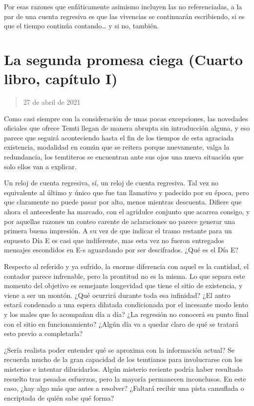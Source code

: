 \documentclass[
]{book}
\begin{document}
Por esas razones que enfáticamente asimismo incluyen las no referenciadas, a la par de una cuenta regresiva es que las vivencias se continuarán escribiendo, si es que el tiempo continúa contando\ldots{} y si no, también.

\hypertarget{la-segunda-promesa-ciega-cuarto-libro-capuxedtulo-i}{%
\section{La segunda promesa ciega (Cuarto libro, capítulo I)}\label{la-segunda-promesa-ciega-cuarto-libro-capuxedtulo-i}}

\begin{quote}
27 de abril de 2021
\end{quote}

Como casi siempre con la consideración de unas pocas excepciones, las novedades oficiales que ofrece Temti llegan de manera abrupta sin introducción alguna, y eso parece que seguirá aconteciendo hasta el fin de los tiempos de esta agraciada existencia, modalidad en común que se reitera porque nuevamente, valga la redundancia, los temtiteros se encuentran ante sus ojos una nueva situación que solo ellos van a explicar.

Un reloj de cuenta regresiva, sí, un reloj de cuenta regresiva. Tal vez no equivalente al último y único que fue tan llamativo y padecido por su época, pero que claramente no puede pasar por alto, menos mientras descuenta. Difiere que ahora el antecedente ha marcado, con el agridulce conjunto que acarrea consigo, y por aquellas razones un conteo carente de aclaraciones no parece generar una primera buena impresión. A su vez de que indicar el tramo restante para un supuesto Día E es casi que indiferente, mas esta vez no fueron entregados mensajes escondidos en E-s aguardando por ser descifrados. ¿Qué es el Día E?

Respecto al referido y ya sufrido, la enorme diferencia con aquel es la cantidad, el contador parece infrenable, pero la prontitud no es la misma. Lo que separa este momento del objetivo es semejante longevidad que tiene el sitio de existencia, y viene a ser un montón. ¿Qué ocurrirá durante toda esa infinidad? ¿El antro estará condenado a una espera dilatada condicionada por el incesante modo lento y los males que lo acompañan día a día? ¿La regresión no conocerá su punto final con el sitio en funcionamiento? ¿Algún día va a quedar claro de qué se tratará esto previo a completarla?

¿Sería realista poder entender qué se aproxima con la información actual? Se recuerda mucho de la gran capacidad de los temtianos para involucrarse con los misterios e intentar dilucidarlos. Algún misterio reciente podría haber resultado resuelto tras pesados esfuerzos, pero la mayoría permanecen inconclusos. En este caso, ¿hay algo más que antes a resolver? ¿Faltará recibir una pista camuflada o encriptada de quién sabe qué forma?
\end{document}
